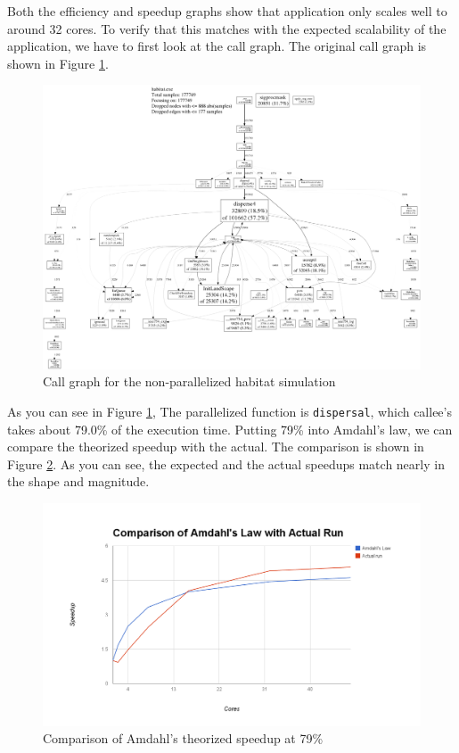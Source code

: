 \documentclass[12pt, notitlepage]{article}
\begin{document}
Both the efficiency and speedup graphs show that application only scales well to around 32 cores.  To verify that this matches with the expected scalability of the application, we have to first look at the call graph.  The original call graph is shown in Figure \ref{fig:originalcall}.

\begin{figure}[ht]
\includegraphics[width=\textwidth]{Include/originalcall.pdf}
\caption{Call graph for the non-parallelized habitat simulation} \label{fig:originalcall}
\end{figure}


As you can see in Figure \ref{fig:originalcall}, The parallelized function is \texttt{dispersal}, which callee's takes about 79.0\% of the execution time.  Putting 79\% into Amdahl's law, we can compare the theorized speedup with the actual.  The comparison is shown in Figure \ref{fig:amdahls}.  As you can see, the expected and the actual speedups match nearly in the shape and magnitude.  

\begin{figure}[ht]
\includegraphics[width=\textwidth]{Include/amdahls.png}
\caption{Comparison of Amdahl's theorized speedup at 79\%} \label{fig:amdahls}
\end{figure}
\end{document}
